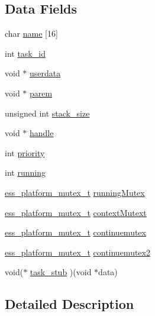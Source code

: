 \subsection*{Data Fields}
\begin{DoxyCompactItemize}
\item 
char \hyperlink{structess__platform__task_acd328517a6cf718155c2e6e22b671ca9}{name} \mbox{[}16\mbox{]}
\item 
int \hyperlink{structess__platform__task_a24913131dc491a81c23f2b8246d85e3b}{task\+\_\+id}
\item 
void $\ast$ \hyperlink{structess__platform__task_afd0ffb02780e738d4c0a10ab833b7834}{userdata}
\item 
void $\ast$ \hyperlink{structess__platform__task_adb63250f3f4a729239fc7335f8773cf2}{parem}
\item 
unsigned int \hyperlink{structess__platform__task_adde5266300e9cdd7ca1134daba9adf24}{stack\+\_\+size}
\item 
void $\ast$ \hyperlink{structess__platform__task_a81011b79683fab64ce3aff71114f8fdd}{handle}
\item 
int \hyperlink{structess__platform__task_acec9ce2df15222151ad66fcb1d74eb9f}{priority}
\item 
int \hyperlink{structess__platform__task_a2f45113638a0b749a8a205d2cd7fb42b}{running}
\item 
\hyperlink{ess__mutex_8h_a35346d1f106b60abe884a13846173479}{ess\+\_\+platform\+\_\+mutex\+\_\+t} \hyperlink{structess__platform__task_a9580906913a08d567aa0f7bc5b7c4150}{running\+Mutex}
\item 
\hyperlink{ess__mutex_8h_a35346d1f106b60abe884a13846173479}{ess\+\_\+platform\+\_\+mutex\+\_\+t} \hyperlink{structess__platform__task_af2a0b7dedca1f101c06a331d6e92b922}{context\+Mutext}
\item 
\hyperlink{ess__mutex_8h_a35346d1f106b60abe884a13846173479}{ess\+\_\+platform\+\_\+mutex\+\_\+t} \hyperlink{structess__platform__task_a22236d8d184eb7c41039a86bcf792380}{continuemutex}
\item 
\hyperlink{ess__mutex_8h_a35346d1f106b60abe884a13846173479}{ess\+\_\+platform\+\_\+mutex\+\_\+t} \hyperlink{structess__platform__task_afecd89745e3e4fa778a0bc75e57a5b6c}{continuemutex2}
\item 
void($\ast$ \hyperlink{structess__platform__task_a66859f9ee9fc430e9bf28644aea7c5c7}{task\+\_\+stub} )(void $\ast$data)
\end{DoxyCompactItemize}


\subsection{Detailed Description}


